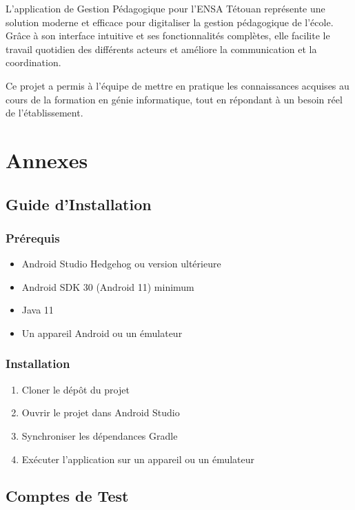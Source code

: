 \documentclass[12pt,a4paper]{report}
\begin{document}
L'application de Gestion Pédagogique pour l'ENSA Tétouan représente une solution moderne et efficace pour digitaliser la gestion pédagogique de l'école. Grâce à son interface intuitive et ses fonctionnalités complètes, elle facilite le travail quotidien des différents acteurs et améliore la communication et la coordination.

Ce projet a permis à l'équipe de mettre en pratique les connaissances acquises au cours de la formation en génie informatique, tout en répondant à un besoin réel de l'établissement.

\appendix

\chapter{Annexes}

\section{Guide d'Installation}

\subsection{Prérequis}

\begin{itemize}
    \item Android Studio Hedgehog ou version ultérieure
    \item Android SDK 30 (Android 11) minimum
    \item Java 11
    \item Un appareil Android ou un émulateur
\end{itemize}

\subsection{Installation}

\begin{enumerate}
    \item Cloner le dépôt du projet
    \item Ouvrir le projet dans Android Studio
    \item Synchroniser les dépendances Gradle
    \item Exécuter l'application sur un appareil ou un émulateur
\end{enumerate}

\section{Comptes de Test}
\end{document}
